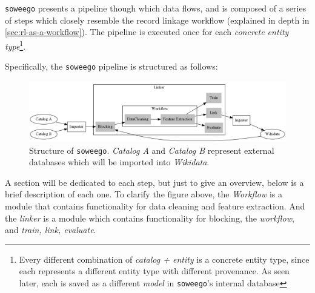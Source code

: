 \documentclass[epsfig,a4paper,11pt,titlepage,twoside,openany]{book}
\begin{document}

\texttt{soweego} presents a pipeline though which data flows, and is composed of a series of steps which closely resemble the record linkage workflow (explained in depth in \autoref{sec:rl-as-a-workflow}). The pipeline is executed once for each \textit{concrete entity type}\footnote{Every different combination of \textit{catalog + entity}  is a concrete entity type, since each represents a different entity type with different provenance. As seen later, each is saved as a different \textit{model} in \texttt{soweego}'s internal database}.

Specifically, the \texttt{soweego} pipeline is structured as follows:

\begin{figure}[H]
  \centering \includegraphics[width=\textwidth]{soweego_structure}
  \caption{Structure of \texttt{soweego}. \textit{Catalog A} and \textit{Catalog
      B} represent external databases which will be imported into
    \textit{Wikidata}.}
  \label{fig:soweego-structure}
\end{figure}

A section will be dedicated to each step, but just to give an overview, below is a brief description of each one. To clarify the figure above, the \textit{Workflow} is a module that contains functionality for data cleaning and feature extraction. And the \textit{linker} is a module which contains functionality for blocking, the \textit{workflow}, and \textit{train, link, evaluate}.
\end{document}
